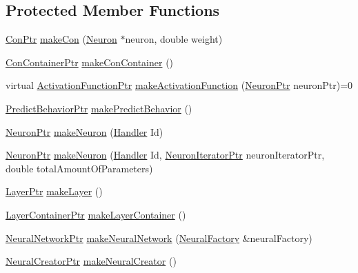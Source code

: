 \subsection*{Protected Member Functions}
\begin{DoxyCompactItemize}
\item 
\hyperlink{_a_m_o_r_e_8h_a169bb8e5f26ce70bf2b10dec2fb5ee50}{ConPtr} \hyperlink{class_r_b_ffactory_a5068c3caacf0525f7069dbec4bf87a67}{makeCon} (\hyperlink{class_neuron}{Neuron} $\ast$neuron, double weight)
\item 
\hyperlink{_a_m_o_r_e_8h_a1021dbaf961d1c8da6d58a8566e5778b}{ConContainerPtr} \hyperlink{class_r_b_ffactory_a0b85ec075904a9d915d1a3527f5d6471}{makeConContainer} ()
\item 
virtual \hyperlink{_a_m_o_r_e_8h_a77602a0277a02e5769c3df0adc669b17}{ActivationFunctionPtr} \hyperlink{class_r_b_ffactory_a5620811041643684e164fb19bd03258b}{makeActivationFunction} (\hyperlink{_a_m_o_r_e_8h_ac1ea936c2c7728eb382278131652fef4}{NeuronPtr} neuronPtr)=0
\item 
\hyperlink{_a_m_o_r_e_8h_a1fb2f1f8fdf1e08c42ef4bdce436af93}{PredictBehaviorPtr} \hyperlink{class_r_b_ffactory_a37c1e41af6f362767be462afcd417726}{makePredictBehavior} ()
\item 
\hyperlink{_a_m_o_r_e_8h_ac1ea936c2c7728eb382278131652fef4}{NeuronPtr} \hyperlink{class_r_b_ffactory_a3c6fa334aaffe3ebcbd35da57e6ce045}{makeNeuron} (\hyperlink{_a_m_o_r_e_8h_abc871abb71cff6655b8172ee7240b8ef}{Handler} Id)
\item 
\hyperlink{_a_m_o_r_e_8h_ac1ea936c2c7728eb382278131652fef4}{NeuronPtr} \hyperlink{class_r_b_ffactory_a244d2f6eb8d7d36b1fc5252ab10797ed}{makeNeuron} (\hyperlink{_a_m_o_r_e_8h_abc871abb71cff6655b8172ee7240b8ef}{Handler} Id, \hyperlink{_a_m_o_r_e_8h_aa794539c0a68e4eb451e7a2cc6294acc}{NeuronIteratorPtr} neuronIteratorPtr, double totalAmountOfParameters)
\item 
\hyperlink{_a_m_o_r_e_8h_acce4b66db3921b7326fbe1a04a56e5fc}{LayerPtr} \hyperlink{class_r_b_ffactory_a6ad31da66b1e633de65bca9e2b6e79c2}{makeLayer} ()
\item 
\hyperlink{_a_m_o_r_e_8h_af261b546158af61fc27686fb926961f2}{LayerContainerPtr} \hyperlink{class_r_b_ffactory_a2f66a1e1b09b4cfffeb4972a4d8b0a3c}{makeLayerContainer} ()
\item 
\hyperlink{_a_m_o_r_e_8h_a7adadf1c313313507b00cd1193db29a1}{NeuralNetworkPtr} \hyperlink{class_r_b_ffactory_a73207bed1447c8b1f5b1c8ecd3dc0d16}{makeNeuralNetwork} (\hyperlink{class_neural_factory}{NeuralFactory} \&neuralFactory)
\item 
\hyperlink{_a_m_o_r_e_8h_aefebabe3353f684b7708712480c15699}{NeuralCreatorPtr} \hyperlink{class_r_b_ffactory_a458d59688c8fb27ee5f9206f248dca03}{makeNeuralCreator} ()
\end{DoxyCompactItemize}


